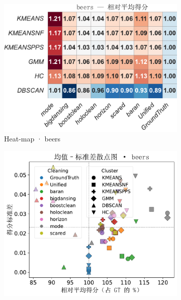\documentclass[10pt]{article} %
\numberwithin{equation}{section}
\begin{document}
\begin{figure}[htbp]
  \centering
  \footnotesize
  \setlength{\abovecaptionskip}{4pt}
  \setlength{\belowcaptionskip}{0pt}

  \begin{subfigure}{0.33\linewidth}
    \centering
    \includegraphics[width=\linewidth]{figures/5.3.1graph/heatmap_rel_beers.pdf}
    \caption{Heat-map · beers}
  \end{subfigure}\hfill
  \begin{subfigure}{0.32\linewidth}
    \centering
    \includegraphics[width=\linewidth]{figures/5.3.1graph/mean_sd_scatter_beers.pdf}

\end{subfigure}
\end{figure}
\end{document}
